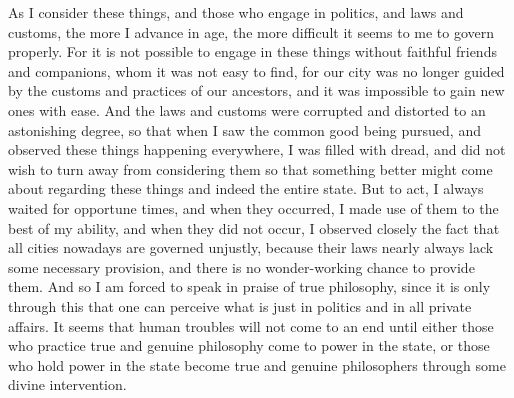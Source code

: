 \documentclass[12pt]{book}
\begin{document}
\begin{pairs}
\begin{Leftside}
\begin{English}
As I consider these things, and those who engage in politics, and laws and customs, the more I advance in age, the more difficult it seems to me to govern properly. For it is not possible to engage in these things without faithful friends and companions, whom it was not easy to find, for our city was no longer guided by the customs and practices of our ancestors, and it was impossible to gain new ones with ease. And the laws and customs were corrupted and distorted to an astonishing degree, so that when I saw the common good being pursued, and observed these things happening everywhere, I was filled with dread, and did not wish to turn away from considering them so that something better might come about regarding these things and indeed the entire state. But to act, I always waited for opportune times, and when they occurred, I made use of them to the best of my ability, and when they did not occur, I observed closely the fact that all cities nowadays are governed unjustly, because their laws nearly always lack some necessary provision, and there is no wonder-working chance to provide them. And so I am forced to speak in praise of true philosophy, since it is only through this that one can perceive what is just in politics and in all private affairs. It seems that human troubles will not come to an end until either those who practice true and genuine philosophy come to power in the state, or those who hold power in the state become true and genuine philosophers through some divine intervention.
\pend
\endnumbering
\end{English}
\end{Leftside}
\end{pairs}
\Columns
\end{document}

